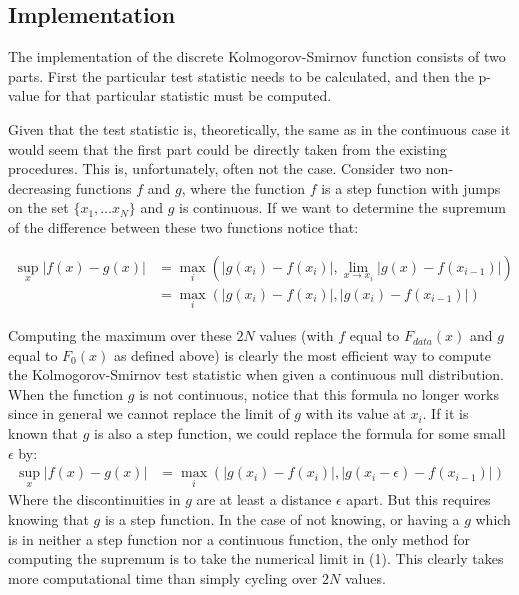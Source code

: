 \documentclass[article]{jss}
\begin{document}
\subsection{Implementation}

The implementation of the discrete Kolmogorov-Smirnov function consists of two parts. First the particular test statistic needs to be calculated,
and then the p-value for that particular statistic must be computed. 

Given that the test statistic is, theoretically, the same as in the
continuous case it would seem that the first part could be directly taken from the existing procedures. This is, unfortunately, often not the case.
Consider two non-decreasing functions $f$ and $g$, where the function $f$ is a step function with jumps on the set $\{x_1, \ldots x_N \}$ and $g$
is continuous. If we want to determine the supremum of the difference between these two functions notice that:

\begin{align}
\sup_x \left| f(x)- g(x) \right| &= \max_i \left( \left|g(x_i) - f(x_i) \right|, \lim_{x \rightarrow x_i} \left| g(x) - f(x_{i-1}) \right| \right) \\
&=  \max_i \left( \left|g(x_i) - f(x_i) \right|, \left| g(x_i) - f(x_{i-1}) \right| \right)
\end{align}

Computing the maximum over these $2N$ values (with $f$ equal to $F_{data}(x)$ and $g$ equal to $F_0(x)$ as defined above) is clearly the 
most efficient way to compute the Kolmogorov-Smirnov test statistic when given a continuous null distribution. When the function $g$ is not
continuous, notice that this formula no longer works since in general we cannot replace the limit of $g$ with its value at $x_i$. If it is known that $g$
is also a step function, we could replace the formula for some small $\epsilon$ by:
\begin{align}
\sup_x \left| f(x)- g(x) \right| &=  \max_i \left( \left|g(x_i) - f(x_i) \right|, \left| g(x_i - \epsilon) - f(x_{i-1}) \right| \right)
\end{align}
Where the discontinuities in $g$ are at least a distance $\epsilon$ apart. But this requires knowing that $g$ is a step function. In the case of not knowing,
or having a $g$ which is in neither a step function nor a continuous function, the only method for computing the supremum is to take the numerical limit in (1). 
This clearly takes more computational time than simply cycling over $2N$ values.
\end{document}
